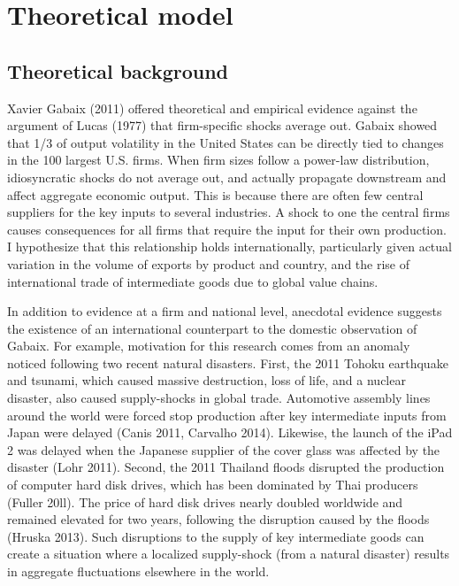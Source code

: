 \documentclass[10pt,letterpaper,pdftex]{article}
\begin{document}
\section{Theoretical model}\thispagestyle{emptyheader} \label{models}
\subsection{Theoretical background} \label{modelstheory}
Xavier Gabaix (2011) offered theoretical and empirical evidence against the argument of Lucas (1977) that firm-specific shocks average out. Gabaix showed that 1/3 of output volatility in the United States can be directly tied to changes in the 100 largest U.S. firms. When firm sizes follow a power-law distribution, idiosyncratic shocks do not average out, and actually propagate downstream and affect aggregate economic output. This is because there are often few central suppliers for the key inputs to several industries. A shock to one the central firms causes consequences for all firms that require the input for their own production. I hypothesize that this relationship holds internationally, particularly given actual variation in the volume of exports by product and country, and the rise of international trade of intermediate goods due to global value chains. 

In addition to evidence at a firm and national level, anecdotal evidence suggests the existence of an international counterpart to the domestic observation of Gabaix. For example, motivation for this research comes from an anomaly noticed following two recent natural disasters. First, the 2011 Tohoku earthquake and tsunami, which caused massive destruction, loss of life, and a nuclear disaster, also caused supply-shocks in global trade. Automotive assembly lines around the world were forced stop production after key intermediate inputs from Japan were delayed (Canis 2011, Carvalho 2014). Likewise, the launch of the iPad 2 was delayed when the Japanese supplier of the cover glass was affected by the disaster (Lohr 2011). Second, the 2011 Thailand floods disrupted the production of computer hard disk drives, which has been dominated by Thai producers (Fuller 20ll). The price of hard disk drives nearly doubled worldwide and remained elevated for two years, following the disruption caused by the floods (Hruska 2013). Such disruptions to the supply of key intermediate goods can create a situation where a localized supply-shock (from a natural disaster) results in aggregate fluctuations elsewhere in the world.
\end{document}
